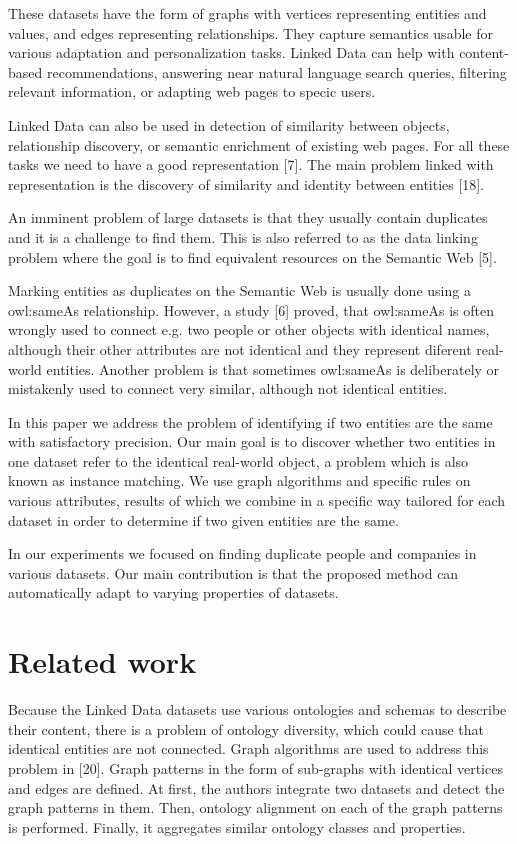 \documentclass{llncs}
\begin{document}
These datasets have the form of graphs with vertices representing entities
and values, and edges representing relationships. They capture semantics usable
for various adaptation and personalization tasks. Linked Data can help with
content-based recommendations, answering near natural language search queries,
filtering relevant information, or adapting web pages to specic users.

Linked Data can also be used in detection of similarity between objects,
relationship discovery, or semantic enrichment of existing web pages. For all these
tasks we need to have a good representation [7]. The main problem linked with
representation is the discovery of similarity and identity between entities [18].

An imminent problem of large datasets is that they usually contain duplicates
and it is a challenge to find them. This is also referred to as the data linking
problem where the goal is to find equivalent resources on the Semantic Web [5].

Marking entities as duplicates on the Semantic Web is usually done using a
owl:sameAs relationship. However, a study [6] proved, that owl:sameAs is often
wrongly used to connect e.g. two people or other objects with identical names,
although their other attributes are not identical and they represent diferent real-
world entities. Another problem is that sometimes owl:sameAs is deliberately or
mistakenly used to connect very similar, although not identical entities.

In this paper we address the problem of identifying if two entities are the same
with satisfactory precision. Our main goal is to discover whether two entities in
one dataset refer to the identical real-world object, a problem which is also
known as instance matching. We use graph algorithms and specific rules on
various attributes, results of which we combine in a specific way tailored for
each dataset in order to determine if two given entities are the same.

In our experiments we focused on finding duplicate people and companies
in various datasets. Our main contribution is that the proposed method can
automatically adapt to varying properties of datasets.

\section{Related work}

Because the Linked Data datasets use various ontologies and schemas to describe
their content, there is a problem of ontology diversity, which could cause that
identical entities are not connected. Graph algorithms are used to address this
problem in [20]. Graph patterns in the form of sub-graphs with identical vertices
and edges are defined. At first, the authors integrate two datasets and detect the
graph patterns in them. Then, ontology alignment on each of the graph patterns
is performed. Finally, it aggregates similar ontology classes and properties.
\end{document}
